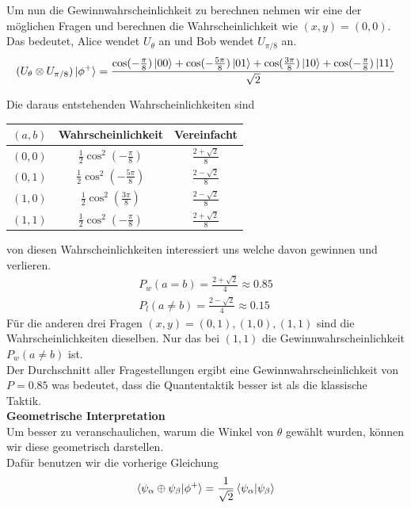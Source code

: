 Um nun die Gewinnwahrscheinlichkeit zu berechnen nehmen wir eine der möglichen Fragen und berechnen die Wahrscheinlichkeit wie $(x, y) = (0, 0)$.\\
Das bedeutet, Alice wendet $U_\theta$ an und Bob wendet $U_{\pi/8}$ an.\\

\begin{equation}
    (U_\theta \otimes U_{\pi/8})\ket{\phi^+} = \frac{\cos(-\frac{\pi}{8})\ket{00} + \cos(-\frac{5\pi}{8})\ket{01} + \cos(\frac{3\pi}{8})\ket{10} + \cos(-\frac{\pi}{8})\ket{11}}{\sqrt{2}}
\end{equation}

Die daraus entstehenden Wahrscheinlichkeiten sind

\begin{center}
    \begin{tabular}{c|c|c}
    $(a, b)$ & Wahrscheinlichkeit & Vereinfacht \\ \hline
    $(0, 0)$ & $\frac{1}{2}\cos^2(-\frac{\pi}{8})$ & $\frac{2+\sqrt{2}}{8}$ \\
    $(0, 1)$ & $\frac{1}{2}\cos^2(-\frac{5\pi}{8})$ & $\frac{2-\sqrt{2}}{8}$ \\
    $(1, 0)$ & $\frac{1}{2}\cos^2(\frac{3\pi}{8})$ & $\frac{2-\sqrt{2}}{8}$ \\
    $(1, 1)$ & $\frac{1}{2}\cos^2(-\frac{\pi}{8})$ & $\frac{2+\sqrt{2}}{8}$
    \end{tabular}
\end{center}

von diesen Wahrscheinlichkeiten interessiert uns welche davon gewinnen und verlieren. 
\begin{align}
    P_w(a = b) = \frac{2+\sqrt{2}}{4} \approx 0.85 \\
    P_l(a \neq b) = \frac{2-\sqrt{2}}{4} \approx 0.15
\end{align}
Für die anderen drei Fragen $(x, y) = (0, 1), (1, 0), (1, 1)$ sind die Wahrscheinlichkeiten dieselben. Nur das bei $(1, 1)$ die Gewinnwahrscheinlichkeit $P_w(a \neq b)$ ist.\\
Der Durchschnitt aller Fragestellungen ergibt eine Gewinnwahrscheinlichkeit von $P = 0.85$ was bedeutet, dass die Quantentaktik besser ist als die klassische Taktik.\\

\textbf{Geometrische Interpretation}\\
Um besser zu veranschaulichen, warum die Winkel von $\theta$ gewählt wurden, können wir diese geometrisch darstellen.\\
Dafür benutzen wir die vorherige Gleichung
\begin{equation}
    \braket{\psi_\alpha \oplus \psi_\beta | \phi^+} = \frac{1}{\sqrt{2}}\braket{\psi_\alpha | \psi_\beta}
\end{equation}

